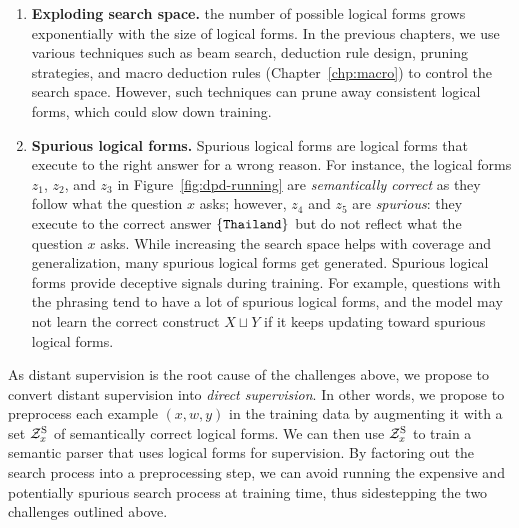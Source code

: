 \begin{enumerate}
\item
\textbf{Exploding search space.}
the number of possible logical forms grows exponentially with
the size of logical forms.
In the previous chapters,
we use various techniques such as beam search,
deduction rule design,
pruning strategies,
and macro deduction rules
(Chapter~\ref{chp:macro})
to control the search space.
However, such techniques can prune away consistent
logical forms, which could slow down training.

\item
\textbf{Spurious logical forms.}
Spurious logical forms are logical forms that execute
to the right answer for a wrong reason.
For instance, the logical forms $z_1$, $z_2$, and $z_3$
in Figure~\ref{fig:dpd-running}
are \emph{semantically correct} as they follow what
the question $x$ asks;
however, $z_4$ and $z_5$ are \emph{spurious}:
they execute to the correct answer $\left\{ \texttt{Thailand} \right\}$
but do not reflect what the question $x$ asks.
While increasing the search space
helps with coverage and generalization,
many spurious logical forms get generated.
Spurious logical forms provide deceptive signals during training.
For example, questions with the phrasing 
tend to have a lot of spurious logical forms,
and the model may not learn the correct construct $X \sqcup Y$
if it keeps updating toward spurious logical forms.
\end{enumerate}

As distant supervision is the root cause of the challenges above,
we propose to convert distant supervision into
\emph{direct supervision}.
In other words,
we propose to
preprocess each example $(x, w, y)$ in the training data
by augmenting it with a set $\mathcal{Z}^\mathrm{S}_x$
of semantically correct logical forms.
We can then use $\mathcal{Z}^\mathrm{S}_x$
to train a semantic parser
that uses logical forms for supervision.
By factoring out the search process into a preprocessing step,
we can avoid running the expensive and potentially spurious
search process at training time,
thus sidestepping the two challenges outlined above.

